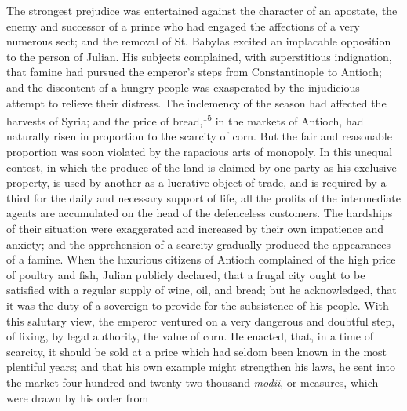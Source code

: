 

The strongest prejudice was entertained against the character of
an apostate, the enemy and successor of a prince who had engaged
the affections of a very numerous sect; and the removal of St.
Babylas excited an implacable opposition to the person of Julian.
His subjects complained, with superstitious indignation, that
famine had pursued the emperor’s steps from Constantinople to
Antioch; and the discontent of a hungry people was exasperated by
the injudicious attempt to relieve their distress. The inclemency
of the season had affected the harvests of Syria; and the price
of bread,\textsuperscript{15} in the markets of Antioch, had naturally risen in
proportion to the scarcity of corn. But the fair and reasonable
proportion was soon violated by the rapacious arts of monopoly.
In this unequal contest, in which the produce of the land is
claimed by one party as his exclusive property, is used by
another as a lucrative object of trade, and is required by a
third for the daily and necessary support of life, all the
profits of the intermediate agents are accumulated on the head of
the defenceless customers. The hardships of their situation were
exaggerated and increased by their own impatience and anxiety;
and the apprehension of a scarcity gradually produced the
appearances of a famine. When the luxurious citizens of Antioch
complained of the high price of poultry and fish, Julian publicly
declared, that a frugal city ought to be satisfied with a regular
supply of wine, oil, and bread; but he acknowledged, that it was
the duty of a sovereign to provide for the subsistence of his
people. With this salutary view, the emperor ventured on a very
dangerous and doubtful step, of fixing, by legal authority, the
value of corn. He enacted, that, in a time of scarcity, it should
be sold at a price which had seldom been known in the most
plentiful years; and that his own example might strengthen his
laws, he sent into the market four hundred and twenty-two
thousand \textit{modii}, or measures, which were drawn by his order from
